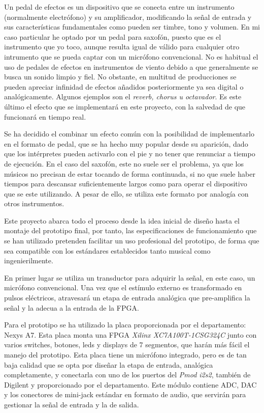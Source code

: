 Un pedal de efectos es un dispositivo que se conecta entre un instrumento (normalmente electrófono) y su amplificador, modificando la señal de entrada y sus características fundamentales como pueden ser timbre, tono y volumen. En mi caso particular he optado por un pedal para saxofón, puesto que es el instrumento que yo toco, aunque resulta igual de válido para cualquier otro intrumento que se pueda captar con un micrófono convencional. No es habitual el uso de pedales de efectos en instrumentos de viento debido a que generalmente se busca un sonido limpio y fiel. No obstante, en multitud de producciones se pueden apreciar infinidad de efectos añadidos posteriormente ya sea digital o analógicamente. Algunos ejemplos son el \emph{reverb, chorus u octavador}. Es este último el efecto que se implementará en este proyecto, con la salvedad de que funcionará en tiempo real. 

Se ha decidido el combinar un efecto común con la posibilidad de implementarlo en el formato de pedal, que se ha hecho muy popular desde su aparición, dado que los intérpretes pueden activarlo con el pie y no tener que renunciar a tiempo de ejecución. En el caso del saxofón, este no suele ser el problema, ya que los músicos no precisan de estar tocando de forma continuada, si no que suele haber tiempos para descansar suficientemente largos como para operar el dispositivo que se este utilizando. A pesar de ello, se utiliza este formato por analogía con otros instrumentos.

Este proyecto abarca todo el proceso desde la idea inicial de diseño hasta el montaje del prototipo final, por tanto, las especificaciones de funcionamiento que se han utilizado pretenden facilitar un uso profesional del prototipo, de forma que sea compatible con los estándares establecidos tanto musical como ingenierilmente.

En primer lugar se utiliza un transductor para adquirir la señal, en este caso, un micrófono convencional. Una vez que el estímulo externo es transformado en pulsos eléctricos, atravesará un etapa de entrada analógica que pre-amplifica la señal y la adecua a la entrada de la FPGA.

Para el prototipo se ha utilizado la placa proporcionada por el departamento: Nexys A7. Esta placa monta una FPGA \emph{Xilinx XC7A100T-1CSG324C} junto con varios switches, botones, leds y displays de 7 segmentos, que harán más fácil el manejo del prototipo. Esta placa tiene un micrófono integrado, pero es de tan baja calidad que se opta por diseñar la etapa de entrada, analógica completamente, y conectarla con uno de los puertos del \emph{Pmod i2s2}, también de Digilent y proporcionado por el departamento. Este módulo contiene ADC, DAC y los conectores de mini-jack estándar en formato de audio, que servirán para gestionar la señal de entrada y la de salida.

